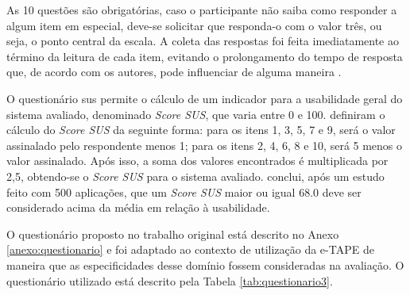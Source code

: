 \par
 As 10 questões são obrigatórias, caso o participante não saiba como responder a algum item em especial, deve-se solicitar que responda-o com o valor três, ou seja, o ponto central da escala. A coleta das respostas 
foi feita imediatamente ao término da leitura de cada item, evitando o prolongamento do tempo de resposta que, de acordo com os autores, pode influenciar de alguma maneira \cite{brooke1996sus}.

\par

O questionário \acrshort{sus} permite o cálculo de um indicador para a usabilidade geral do sistema avaliado, denominado \textit{Score SUS}, que varia entre 0 e 100. 
 definiram o cálculo do \textit{Score SUS} da seguinte forma:
para os itens 1, 3, 5, 7 e 9, será o valor assinalado pelo respondente menos 1; para os itens 2, 4, 6, 8 e 10, será 5 menos o valor assinalado. Após isso, a soma dos valores 
encontrados é multiplicada por 2,5, obtendo-se o \textit{Score SUS} para o sistema avaliado.  conclui, após um estudo feito com 500 aplicações, 
que um \textit{Score SUS} maior ou igual 68.0 deve ser considerado acima da média em relação à usabilidade.

\par
O questionário proposto no trabalho original está descrito no Anexo \ref{anexo:questionario} e foi adaptado ao contexto de utilização da e-TAPE de maneira que as especificidades desse domínio fossem consideradas na avaliação. 
O questionário utilizado está descrito pela Tabela \ref{tab:questionario3}.


